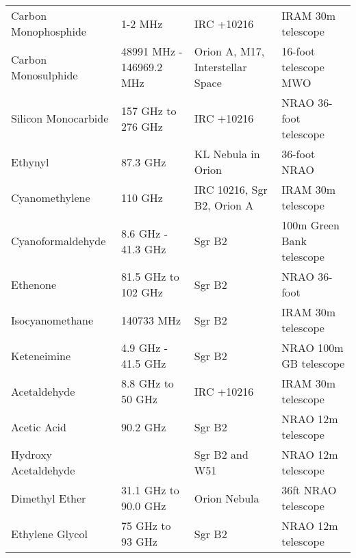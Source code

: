 \documentclass{article}
\begin{document}
\begin{tabular}{|m{3cm}|m{3cm}|m{3cm}|m{3cm}|}
\hline
        
        Carbon Monophosphide & 1-2 MHz& IRC +10216 & IRAM 30m telescope  \\
        
        Carbon Monosulphide & 48991 MHz - 146969.2 MHz & Orion A, M17, Interstellar Space  & 16-foot telescope MWO \\
        
        Silicon Monocarbide & 157 GHz to 276 GHz & IRC +10216 & NRAO 36-foot telescope  \\
        
        Ethynyl  & 87.3 GHz & KL Nebula in Orion & 36-foot NRAO \\
        
        Cyanomethylene & 110 GHz  & IRC 10216, Sgr B2, Orion A & IRAM 30m telescope \\
        
        Cyanoformaldehyde & 8.6 GHz - 41.3 GHz & Sgr B2 & 100m Green Bank telescope  \\
        
        Ethenone & 81.5 GHz to 102 GHz & Sgr B2  & NRAO 36-foot \\
        
        Isocyanomethane  & 140733 MHz& Sgr B2 & IRAM 30m telescope  \\
        
        Keteneimine & 4.9 GHz - 41.5 GHz & Sgr B2  &  NRAO 100m GB telescope \\
        
        Acetaldehyde & 8.8 GHz to 50 GHz & IRC +10216& IRAM 30m telescope   \\
        
        
        
        Acetic Acid  & 90.2 GHz & Sgr B2 & NRAO 12m telescope \\
        
        Hydroxy Acetaldehyde & & Sgr B2 and W51  & NRAO 12m telescope \\
        
        Dimethyl Ether  & 31.1 GHz to 90.0 GHz & Orion Nebula & 36ft NRAO telescope \\
        
        Ethylene Glycol  & 75 GHz to 93 GHz & Sgr B2 & NRAO 12m telescope \\
        
        
        

\end{tabular}
\end{document}
